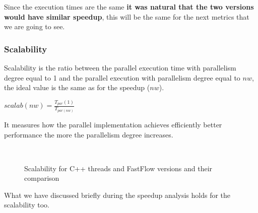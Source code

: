 Since the execution times are the same \textbf{it was natural that the two versions would have similar speedup}, this will be the same for the next metrics that we are going to see.
\subsubsection{Scalability}
Scalability is the ratio between the parallel execution time with parallelism degree equal to 1 and the parallel execution with parallelism degree equal to $nw$, the ideal value is the same as for the speedup ($nw$).
\begin{center}
\begin{Large}
$scalab(nw)=\frac{T_{par}(1)}{T_{par(nw)}}$
\end{Large}
\end{center}
It measures how the parallel implementation achieves efficiently better performance the more the parallelism degree increases.
\begin{figure}[H]
    \centering
    \\
    \caption{Scalability for C++ threads and FastFlow versions and their comparison}
    \label{fig:scalability}
\end{figure}
What we have discussed briefly during the speedup analysis holds for the scalability too.

